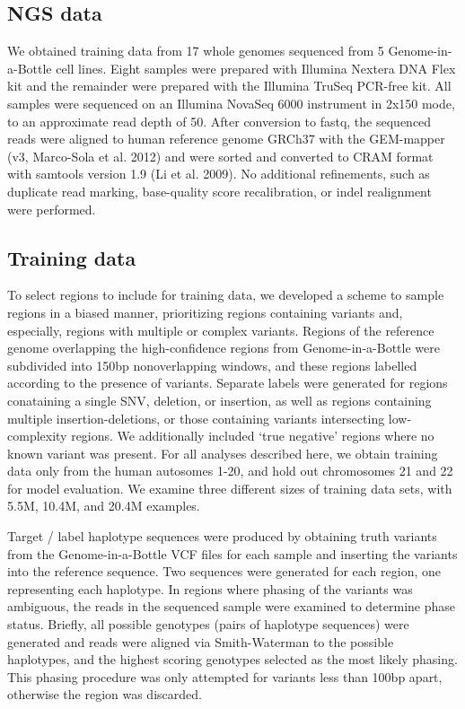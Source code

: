 \documentclass[]{article}
\begin{document}
\subsection{NGS data}

We obtained training data from 17 whole genomes sequenced from 5 Genome-in-a-Bottle cell lines. Eight samples were prepared with Illumina Nextera DNA Flex kit and the remainder were prepared with the Illumina TruSeq PCR-free kit. All samples were sequenced on an Illumina NovaSeq 6000 instrument in 2x150 mode, to an approximate read depth of 50. After conversion to fastq, the sequenced reads were aligned to human reference genome GRCh37 with the GEM-mapper (v3, Marco-Sola et al. 2012) and were sorted and converted to CRAM format with samtools version 1.9 (Li et al. 2009). No additional refinements, such as duplicate read marking, base-quality score recalibration, or indel realignment were performed.

\subsection{Training data}

To select regions to include for training data, we developed a scheme to sample regions in a biased manner, prioritizing regions containing variants and, especially, regions with multiple or complex variants. Regions of the reference genome overlapping the high-confidence regions from Genome-in-a-Bottle were subdivided into 150bp nonoverlapping windows, and these regions labelled according to the presence of variants. Separate labels were generated for regions conataining a single SNV, deletion, or insertion, as well as regions containing multiple insertion-deletions, or those containing variants intersecting low-complexity regions. We additionally included `true negative' regions where no known variant was present.  For all analyses described here, we obtain training data only from the human autosomes 1-20, and hold out chromosomes 21 and 22 for model evaluation.  We examine three different sizes of training data sets, with 5.5M, 10.4M, and 20.4M examples. 

Target / label haplotype sequences were produced by obtaining truth variants from the Genome-in-a-Bottle VCF files for each sample and inserting the variants into the reference sequence. Two sequences were generated for each region, one representing each haplotype. In regions where phasing of the variants was ambiguous, the reads in the sequenced sample were examined to determine phase status. Briefly, all possible genotypes (pairs of haplotype sequences) were generated and reads were aligned via Smith-Waterman to the possible haplotypes, and the highest scoring genotypes selected as the most likely phasing. This phasing procedure was only attempted for variants less than 100bp apart, otherwise the region was discarded.
\end{document}
